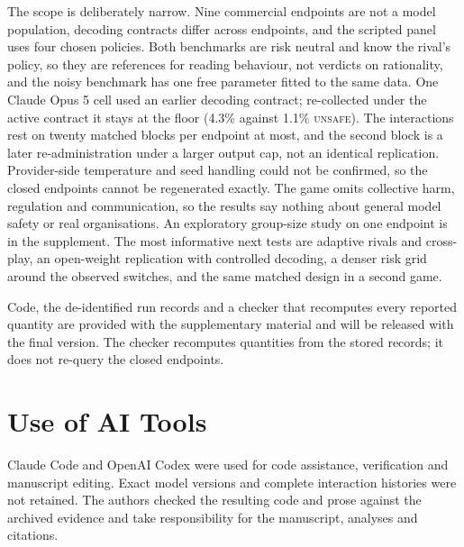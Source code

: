 \documentclass{article}
\newcommand{\Unsafe}{\textsc{unsafe}}
\begin{document}
The scope is deliberately narrow. Nine commercial endpoints are not a model
population, decoding contracts differ across endpoints, and the scripted panel
uses four chosen policies. Both benchmarks are risk neutral and know the rival's policy, so they are
references for reading behaviour, not verdicts on rationality, and the noisy
benchmark has one free parameter fitted to the same data.
One Claude Opus 5 cell used an earlier decoding contract; re-collected under
the active contract it stays at the floor (4.3\% against 1.1\% \Unsafe{}). The interactions rest on
twenty matched blocks per endpoint at most, and the second block is a later
re-administration under a larger output cap, not an identical replication. Provider-side temperature and seed handling could not be confirmed, so
the closed endpoints cannot be regenerated exactly. The game omits collective
harm, regulation and communication, so the results say nothing about general
model safety or real organisations. An exploratory group-size study on one
endpoint is in the supplement. The most informative next tests are adaptive
rivals and cross-play, an open-weight replication with controlled decoding, a
denser risk grid around the observed switches, and the same matched design in a
second game.

Code, the de-identified run records and a checker that recomputes every
reported quantity are provided with the supplementary material and will be
released with the final version. The checker recomputes quantities from the
stored records; it does not re-query the closed endpoints.

%
 
\section*{Use of AI Tools}
Claude Code and OpenAI Codex were used for code assistance, verification and
manuscript editing. Exact model versions and complete interaction histories were
not retained. The authors checked the resulting code and prose against the
archived evidence and take responsibility for the manuscript, analyses and
citations.

\clearpage


\end{document}

